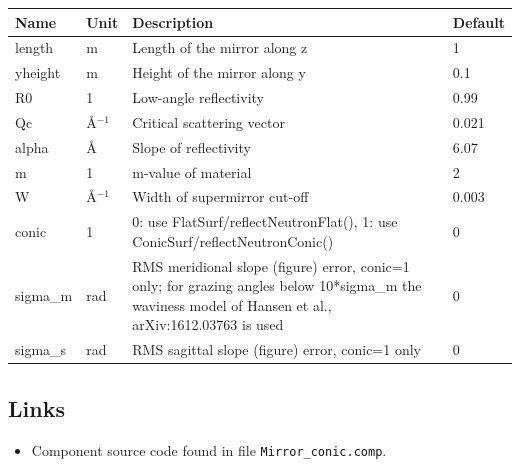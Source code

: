 \begin{longtable}{p{}p{}p{}p{}}
\toprule
\textbf{Name} & \textbf{Unit} & \textbf{Description} & \textbf{Default} \\
\midrule
\endhead
length & m & Length of the mirror along z & 1 \\
yheight & m & Height of the mirror along y & 0.1 \\
R0 & 1 & Low-angle reflectivity & 0.99 \\
Qc & \AA{}$^{-1}$ & Critical scattering vector & 0.021 \\
alpha & \AA{} & Slope of reflectivity & 6.07 \\
m & 1 & m-value of material & 2 \\
W & \AA{}$^{-1}$ & Width of supermirror cut-off & 0.003 \\
conic & 1 & 0: use FlatSurf/reflectNeutronFlat(), 1: use ConicSurf/reflectNeutronConic() & 0 \\
sigma\_m & rad & RMS meridional slope (figure) error, conic=1 only; for grazing angles below 10*sigma\_m the waviness model of Hansen et al., arXiv:1612.03763 is used & 0 \\
sigma\_s & rad & RMS sagittal slope (figure) error, conic=1 only & 0 \\
\bottomrule
\end{longtable}

\subsection*{Links}
\begin{itemize}
  \item Component source code found in file \texttt{Mirror\_conic.comp}.
\end{itemize}

